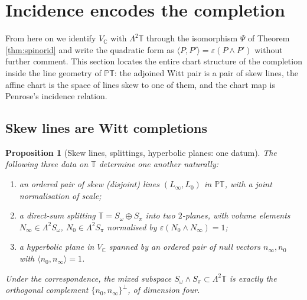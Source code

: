 \documentclass[11pt]{article}
\newtheorem{proposition}[theorem]{Proposition}
\theoremstyle{definition}
\newcommand{\C}{\mathbb{C}}
\newcommand{\T}{\mathbb{T}}
\newcommand{\PT}{\mathbb{PT}}
\newcommand{\nO}{n_0}
\newcommand{\nInf}{n_\infty}
\newcommand{\ip}[2]{\langle #1, #2\rangle}
\newcommand{\Som}{S_\omega}
\newcommand{\Spi}{S_\pi}
\begin{document}
\section{Incidence encodes the completion}\label{sec:incidence}

From here on we identify $V_\C$ with $\Lambda^2\T$ through the isomorphism $\Psi$ of Theorem \ref{thm:spinorid} and write the quadratic form as $\ip{P}{P'} = \varepsilon(P \wedge P')$ without further comment. This section locates the entire chart structure of the completion inside the line geometry of $\PT$: the adjoined Witt pair is a pair of skew lines, the affine chart is the space of lines skew to one of them, and the chart map is Penrose's incidence relation.

\subsection{Skew lines are Witt completions}\label{subsec:skew}

\begin{proposition}[Skew lines, splittings, hyperbolic planes: one datum]\label{prop:skewwitt}
The following three data on $\T$ determine one another naturally:
\begin{enumerate}
\item an ordered pair of skew (disjoint) lines $(L_\infty, L_0)$ in $\PT$, with a joint normalisation of scale;
\item a direct-sum splitting $\T = \Som \oplus \Spi$ into two $2$-planes, with volume elements $N_\infty \in \Lambda^2\Som$, $N_0 \in \Lambda^2\Spi$ normalised by $\varepsilon(N_0 \wedge N_\infty) = 1$;
\item a hyperbolic plane in $V_\C$ spanned by an ordered pair of null vectors $\nInf, \nO$ with $\ip{\nO}{\nInf} = 1$.
\end{enumerate}
Under the correspondence, the mixed subspace $\Som \wedge \Spi \subset \Lambda^2\T$ is exactly the orthogonal complement $\{\nO, \nInf\}^\perp$, of dimension four.
\end{proposition}
\end{document}
